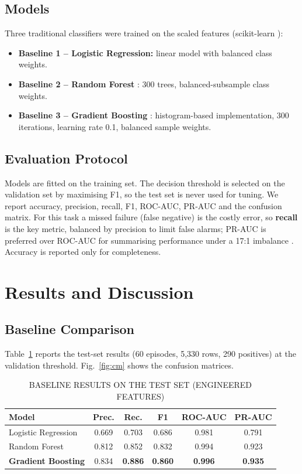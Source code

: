 \documentclass[conference]{IEEEtran}
\begin{document}
\subsection{Models}
Three traditional classifiers were trained on the scaled features (scikit-learn
\cite{pedregosa2011}):
\begin{itemize}
\item \textbf{Baseline 1 -- Logistic Regression:} linear model with balanced class weights.
\item \textbf{Baseline 2 -- Random Forest} \cite{breiman2001}: 300 trees, balanced-subsample class weights.
\item \textbf{Baseline 3 -- Gradient Boosting} \cite{friedman2001}: histogram-based implementation, 300 iterations, learning rate 0.1, balanced sample weights.
\end{itemize}

\subsection{Evaluation Protocol}
Models are fitted on the training set. The decision threshold is selected on the validation
set by maximising F1, so the test set is never used for tuning. We report accuracy,
precision, recall, F1, ROC-AUC, PR-AUC and the confusion matrix. For this task a missed
failure (false negative) is the costly error, so \textbf{recall} is the key metric, balanced
by precision to limit false alarms; PR-AUC is preferred over ROC-AUC for summarising
performance under a 17:1 imbalance \cite{saito2015}. Accuracy is reported only for completeness.

\section{Results and Discussion}

\subsection{Baseline Comparison}
Table~\ref{tab:results} reports the test-set results (60 episodes, 5,330 rows, 290 positives)
at the validation threshold. Fig.~\ref{fig:cm} shows the confusion matrices.

\begin{table}[t]
\caption{BASELINE RESULTS ON THE TEST SET (ENGINEERED FEATURES)}
\label{tab:results}
\centering
\begin{tabular}{|l|c|c|c|c|c|}
\hline
\textbf{Model} & \textbf{Prec.} & \textbf{Rec.} & \textbf{F1} & \textbf{ROC-AUC} & \textbf{PR-AUC} \\ \hline
Logistic Regression & 0.669 & 0.703 & 0.686 & 0.981 & 0.791 \\ \hline
Random Forest & 0.812 & 0.852 & 0.832 & 0.994 & 0.923 \\ \hline
\textbf{Gradient Boosting} & 0.834 & \textbf{0.886} & \textbf{0.860} & \textbf{0.996} & \textbf{0.935} \\ \hline
\end{tabular}
\end{table}
\end{document}
